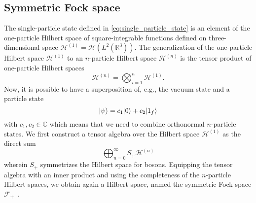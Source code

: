 \subsection{Symmetric Fock space}

The single-particle state defined in \cref{eq:single_particle_state} is an element of the one-particle Hilbert space of square-integrable functions defined on three-dimensional space $\mathcal{H}^{(1)}=\mathcal{H}\left(L^2(\mathbb{R}^3)\right)$.
The generalization of the one-particle Hilbert space $\mathcal{H}^{(1)}$ to an $n$-particle Hilbert space $\mathcal{H}^{(n)}$ is the tensor product of one-particle Hilbert spaces
\begin{equation}
	\mathcal{H}^{(n)}
	=
	\bigotimes^n_{i=1}
	\mathcal{H}^{(1)}
	.
\end{equation}
Now, it is possible to have a superposition of, e.g., the vacuum state and a particle state
\begin{equation}
	\lvert\psi\rangle
	=
	c_1
	\lvert0\rangle
	+
	c_2
	\lvert1_f\rangle
\end{equation}
with $c_1,c_2\in\mathbb{C}$ which means that we need to combine orthonormal $n$-particle states.
We first construct a tensor algebra over the Hilbert space $\mathcal{H}^{(1)}$ as the direct sum~\cite[p.~290]{Bogolubov1989}
\begin{equation}
	\bigoplus^\infty_{n=0}
	S_+
	\mathcal{H}^{(n)}
\end{equation}
wherein $S_+$ symmetrizes the Hilbert space for bosons.
Equipping the tensor algebra with an inner product and using the completeness of the $n$-particle Hilbert spaces, we obtain again a Hilbert space, named the symmetric Fock space $\mathcal{F}_+$~\cite[p.~35]{Haag2012}.